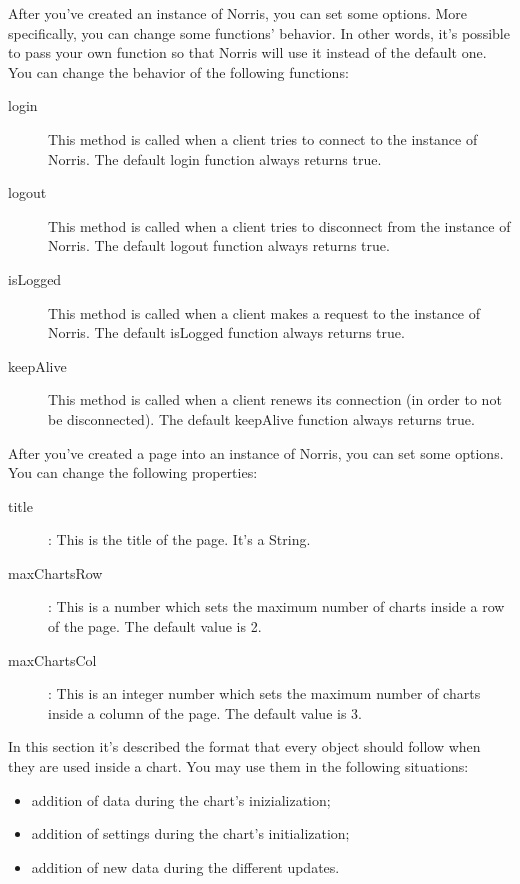  \label{sec:ObjectsDescription}
	 \label{sec:ObjectsDescriptionNorris}
		After you've created an instance of Norris, you can set some options. More specifically, you can change some functions' behavior. In other words, it's possible to pass your own function so that Norris will use it instead of the default one.\\
		You can change the behavior of the following functions:
		\begin{description}
			\item[login] This method is called when a client tries to connect to the instance of Norris. The default login function always returns true.
			\item[logout] This method is called when a client tries to disconnect from the instance of Norris. The default logout function always returns true.
			\item[isLogged] This method is called when a client makes a request to the instance of Norris. The default isLogged function always returns true.
			\item[keepAlive] This method is called when a client renews its connection (in order to not be disconnected). The default keepAlive function always returns true.
		\end{description}
		After you've created a page into an instance of Norris, you can set some options. You can change the following properties:
		\begin{description}
			\item[title]: This is the title of the page. It's a String.
			\item[maxChartsRow]: This is a number which sets the maximum number of charts inside a row of the page. The default value is 2.
			\item[maxChartsCol]: This is an integer number which sets the maximum number of charts inside a column of the page. The default value is 3.
		\end{description}
		In this section it's described the format that every  object should follow when they are used inside a chart. You may use them in the following situations:
		\begin{itemize}
			\item addition of data during the chart's inizialization;
			\item addition of settings during the chart's initialization;
			\item addition of new data during the different updates.
		\end{itemize}

